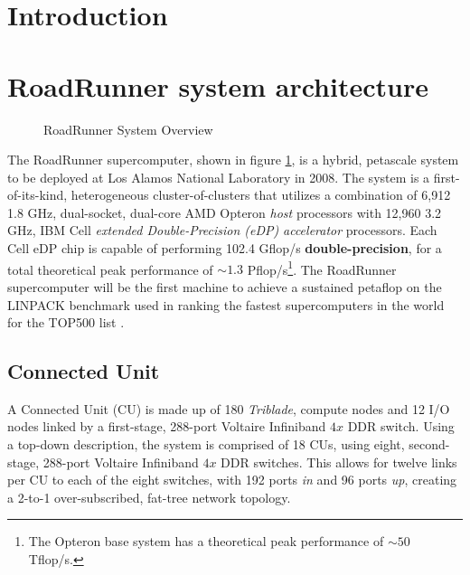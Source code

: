 \documentclass[letter,10pt]{article}
\newcommand{\note}[1]{\marginpar{\small{\color{red} #1}}}
\begin{document}
\section*{Introduction}
\note{Place holder}

\cite{Bowers_et_al_Phys_Plasmas_2007}

\section*{RoadRunner system architecture}

\begin{figure}
    \begin{center}
    \scalebox{0.3}{}
    \caption{RoadRunner System Overview}
    \label{fig:system}
    \end{center}
\end{figure}

The RoadRunner supercomputer, shown in figure \ref{fig:system}, is a hybrid, petascale system to be deployed at Los Alamos National Laboratory in 2008.  The system is a first-of-its-kind, heterogeneous cluster-of-clusters that utilizes a combination of 6,912 1.8 GHz, dual-socket, dual-core AMD Opteron \emph{host} processors with 12,960 3.2 GHz, IBM Cell \emph{extended Double-Precision (eDP)} \emph{accelerator} processors.  Each Cell eDP chip is capable of performing 102.4 Gflop/s \textbf{double-precision}, for a total theoretical peak performance of $\sim1.3$ Pflop/s\footnote{The Opteron base system has a theoretical peak performance of $\sim50$ Tflop/s.}.  The RoadRunner supercomputer will be the first machine to achieve a sustained petaflop on the LINPACK benchmark used in ranking the fastest supercomputers in the world for the TOP500 list \cite{top500}.

\subsection*{Connected Unit}

A Connected Unit (CU) is made up of 180 \emph{Triblade}, compute nodes and 12 I/O nodes linked by a first-stage, 288-port Voltaire Infiniband $4x$ DDR switch.  Using a top-down description, the system is comprised of 18 CUs, using eight, second-stage, 288-port Voltaire Infiniband $4x$ DDR switches.  This allows for twelve links per CU to each of the eight switches, with 192 ports \emph{in} and 96 ports \emph{up}, creating a 2-to-1 over-subscribed, fat-tree network topology.
\end{document}
